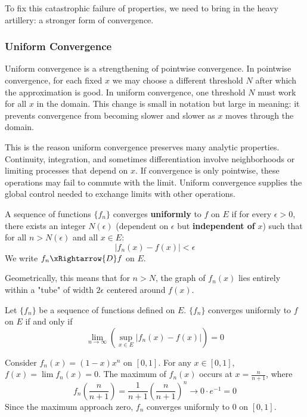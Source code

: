 To fix this catastrophic failure of properties, we need to bring in the heavy artillery: a stronger form of convergence.

\subsubsection{Uniform Convergence}


Uniform convergence is a strengthening of pointwise convergence. In pointwise convergence, for each fixed $x$ we may choose a different threshold $N$ after which the approximation is good. In uniform convergence, one threshold $N$ must work for all $x$ in the domain. This change is small in notation but large in meaning: it prevents convergence from becoming slower and slower as $x$ moves through the domain.

This is the reason uniform convergence preserves many analytic properties. Continuity, integration, and sometimes differentiation involve neighborhoods or limiting processes that depend on $x$. If convergence is only pointwise, these operations may fail to commute with the limit. Uniform convergence supplies the global control needed to exchange limits with other operations.

\begin{definition}
A sequence of functions $\{f_n\}$ converges \textbf{uniformly} to $f$ on $E$ if for every $\epsilon > 0$, there exists an integer $N(\epsilon)$ (dependent on $\epsilon$ but \textbf{independent of} $x$) such that for all $n > N(\epsilon)$ and all $x \in E$:
\[ |f_n(x) - f(x)| < \epsilon \]
We write $f_n \xRightarrow{D} f$ on $E$.
\end{definition}

Geometrically, this means that for $n > N$, the graph of $f_n(x)$ lies entirely within a "tube" of width $2\epsilon$ centered around $f(x)$.

\begin{theorem}
Let $\{f_n\}$ be a sequence of functions defined on $E$. $\{f_n\}$ converges uniformly to $f$ on $E$ if and only if
\[ \lim_{n \to \infty} \left( \sup_{x \in E} |f_n(x) - f(x)| \right) = 0 \]
\end{theorem}

\begin{example}
Consider $f_n(x) = (1-x)x^n$ on $[0,1]$. For any $x \in [0,1]$, $f(x) = \lim f_n(x) = 0$.
The maximum of $f_n(x)$ occurs at $x = \frac{n}{n+1}$, where
\[ f_n\left(\frac{n}{n+1}\right) = \frac{1}{n+1} \left(\frac{n}{n+1}\right)^n \to 0 \cdot e^{-1} = 0 \]
Since the maximum approach zero, $f_n$ converges uniformly to $0$ on $[0,1]$.
\end{example}

